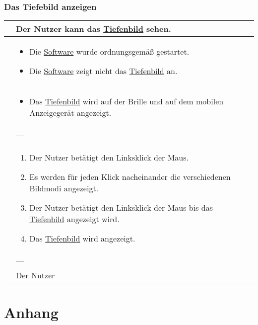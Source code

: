 \subsubsection{Das Tiefebild anzeigen}
\begin{center}
	\begin{longtable}{| p{3cm} | p{12cm} |}
		\hline
		\goal & Der Nutzer kann das \hyperlink{tab:tiefe}{Tiefenbild} sehen. \\ \hline
		
		\precondition & \begin{itemize}
			\item Die \hyperlink{tab:anwendung}{Software} wurde ordnungsgemäß gestartet.
			\item Die \hyperlink{tab:anwendung}{Software} zeigt nicht das \hyperlink{tab:tiefe}{Tiefenbild} an.
		\end{itemize} \\ \hline
		
		\postcondition & \begin{itemize}
			\item Das \hyperlink{tab:tiefe}{Tiefenbild} wird auf der Brille und auf dem mobilen Anzeigegerät angezeigt.
		\end{itemize} \\ \hline
		
		\postexception & --- \\ \hline
		
		\flow & \begin{enumerate}
			\item Der Nutzer betätigt den Linksklick der Maus.
			\item Es werden für jeden Klick nacheinander die verschiedenen Bildmodi angezeigt.
			\item Der Nutzer betätigt den Linksklick der Maus bis das \hyperlink{tab:tiefe}{Tiefenbild} angezeigt wird.
			\item Das \hyperlink{tab:tiefe}{Tiefenbild} wird angezeigt.			
		\end{enumerate} \\ \hline
		
		\exception & --- \\ \hline
		
		\player & Der Nutzer \\
		\hline
	\end{longtable}
\end{center}

\section{Anhang}
\label{chap:spezi_append}

